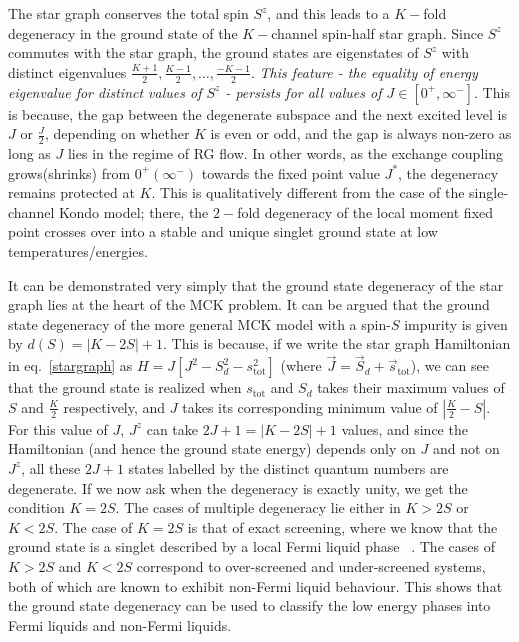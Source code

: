 \documentclass[12pt]{revtex4-2}
\begin{document}
The star graph conserves the total spin \(S^z\), and this leads to a \(K-\)fold degeneracy in the ground state of the \(K-\)channel spin-half star graph. Since \(S^z\) commutes with the star graph, the ground states are eigenstates of \(S^z\) with distinct eigenvalues \(\frac{K+1}{2}, \frac{K-1}{2},\ldots,\frac{-K-1}{2}\). \textit{This feature - the equality of energy eigenvalue for distinct values of \(S^z\) - persists for all values of \(J \in \left[0^+, \infty^-\right]\)}. This is because, the gap between the degenerate subspace and the next excited level is \(J\) or \(\frac{J}{2}\), depending on whether \(K\) is even or odd, and the gap is always non-zero as long as \(J\) lies in the regime of RG flow. In other words, as the exchange coupling grows(shrinks) from \(0^+\left(\infty^-\right)\) towards the fixed point value \(J^*\), the degeneracy remains protected at \(K\). This is qualitatively different from the case of the single-channel Kondo model; there, the \(2-\)fold degeneracy of the local moment fixed point crosses over into a stable and unique singlet ground state at low temperatures/energies.

It can be demonstrated very simply that the ground state degeneracy of the star graph lies at the heart of the MCK problem. It can be argued that the ground state degeneracy of the more general MCK model with a spin-\(S\) impurity is given by \(d(S) = |K - 2S|+1\). This is because, if we write the star graph Hamiltonian in eq.~\ref{stargraph} as \(H = J\left[J^2 - S_d^2 - s^2_\text{tot}\right] \) (where \(\vec J = \vec S_d + \vec s_\text{tot}\)), we can see that the ground state is realized when \(s_\text{tot}\) and \(S_d\) takes their maximum values of \(S\) and \(\frac{K}{2}\) respectively, and \(J\) takes its corresponding minimum value of \(|\frac{K}{2} - S|\). For this value of \(J\), \(J^z\) can take \(2J+1 = |K - 2S|+1\) values, and since the Hamiltonian (and hence the ground state energy) depends only on \(J\) and not on \(J^z\), all these \(2J+1\) states labelled by the distinct quantum numbers are degenerate. If we now ask when the degeneracy is exactly unity, we get the condition \(K=2S\). The cases of multiple degeneracy lie either in \(K>2S\) or \(K<2S\). The case of \(K=2S\) is that of exact screening, where we know that the ground state is a singlet described by a local Fermi liquid phase \cite{wilson1975,nozieres1974fermi,Noz_blandin_1980,andreiKondoreview,tsvelickKondoreview}~\cite{Noz_blandin_1980,Gan_Andrei_Coleman_1993,emery_kivelson,Gan_mchannel_1994,Tsvelick_Weigmann_mchannel_1984,Tsvelick_weigmann_mchannel_1985,parcollet_olivier_large_N,kimura_taro_Su_N_kondo,PhysRevB.73.224445,cox_jarrell_two_channel_rev,affleck_1991_overscreen,Coleman_tsvelik,affleck1993exact,coleman_pepin_2003,roch_nicolas_costi_2009,schiller_avraham_2008,Durganandini_2011}. The cases of \(K>2S\) and \(K<2S\) correspond to over-screened and under-screened systems, both of which are known to exhibit non-Fermi liquid behaviour. This shows that the ground state degeneracy can be used to classify the low energy phases into Fermi liquids and non-Fermi liquids.
\end{document}
